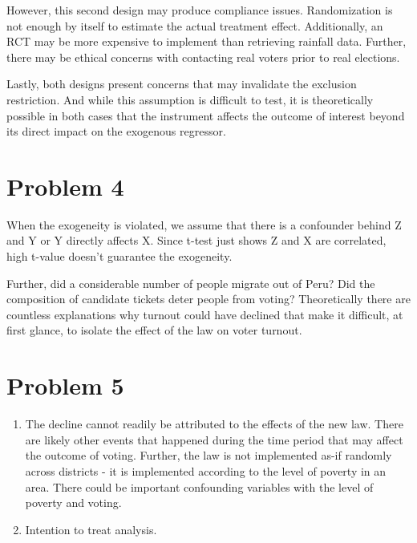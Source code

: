 \documentclass[
]{article}
\begin{document}
However, this second design may produce compliance issues. Randomization
is not enough by itself to estimate the actual treatment effect.
Additionally, an RCT may be more expensive to implement than retrieving
rainfall data. Further, there may be ethical concerns with contacting
real voters prior to real elections.

Lastly, both designs present concerns that may invalidate the exclusion
restriction. And while this assumption is difficult to test, it is
theoretically possible in both cases that the instrument affects the
outcome of interest beyond its direct impact on the exogenous regressor.

\hypertarget{problem-4}{%
\section{Problem 4}\label{problem-4}}

When the exogeneity is violated, we assume that there is a confounder
behind Z and Y or Y directly affects X. Since t-test just shows Z and X
are correlated, high t-value doesn't guarantee the exogeneity.

Further, did a considerable number of people migrate out of Peru? Did
the composition of candidate tickets deter people from voting?
Theoretically there are countless explanations why turnout could have
declined that make it difficult, at first glance, to isolate the effect
of the law on voter turnout.

\hypertarget{problem-5}{%
\section{Problem 5}\label{problem-5}}

\begin{enumerate}
\def\labelenumi{(\alph{enumi})}
\item
  The decline cannot readily be attributed to the effects of the new
  law. There are likely other events that happened during the time
  period that may affect the outcome of voting. Further, the law is not
  implemented as-if randomly across districts - it is implemented
  according to the level of poverty in an area. There could be important
  confounding variables with the level of poverty and voting.
\item
  Intention to treat analysis.
\end{enumerate}
\end{document}
